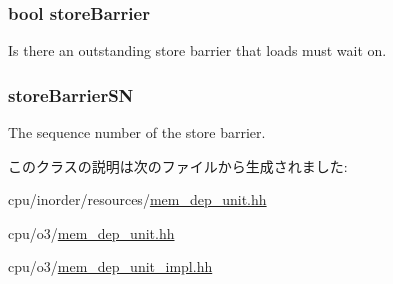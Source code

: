 \hypertarget{classMemDepUnit_ac066575fbaeda40cc6b2017292dfb0bf}{
\subsubsection[{storeBarrier}]{\setlength{\rightskip}{0pt plus 5cm}bool {\bf storeBarrier}}}
\label{classMemDepUnit_ac066575fbaeda40cc6b2017292dfb0bf}
Is there an outstanding store barrier that loads must wait on. \hypertarget{classMemDepUnit_ae3e16866c4d84194ff7f414f00d71e94}{
\subsubsection[{storeBarrierSN}]{ {\bf storeBarrierSN}}}
\label{classMemDepUnit_ae3e16866c4d84194ff7f414f00d71e94}
The sequence number of the store barrier. 

このクラスの説明は次のファイルから生成されました:\begin{DoxyCompactItemize}
\item 
cpu/inorder/resources/\hyperlink{inorder_2resources_2mem__dep__unit_8hh}{mem\_\-dep\_\-unit.hh}\item 
cpu/o3/\hyperlink{o3_2mem__dep__unit_8hh}{mem\_\-dep\_\-unit.hh}\item 
cpu/o3/\hyperlink{mem__dep__unit__impl_8hh}{mem\_\-dep\_\-unit\_\-impl.hh}\end{DoxyCompactItemize}
